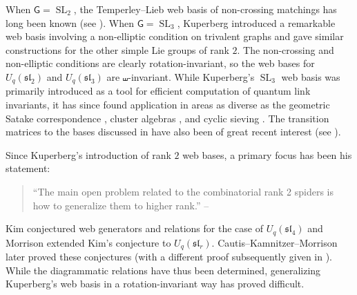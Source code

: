 \documentclass{amsart}
\theoremstyle{definition}
\theoremstyle{remark}
\numberwithin{equation}{section}
\DeclareMathOperator{\SL}{SL}
\newcommand{\fsl}{\mathfrak{sl}}
\begin{document}
When $\mathsf{G} = \SL_2$, the Temperley--Lieb web basis of non-crossing matchings has long been known (see \cite{Temperley.Lieb,Kung-Rota,Kauffman.Lins}). When $\mathsf{G} = \SL_3$, Kuperberg \cite{Kuperberg} introduced a remarkable web basis involving a non-elliptic condition on trivalent graphs and gave similar constructions for the other simple Lie groups of rank $2$. The non-crossing and non-elliptic conditions are clearly rotation-invariant, so the web bases for $U_q(\fsl_2)$ and $U_q(\fsl_3)$ are $\shuffle$-invariant. While Kuperberg's $\SL_3$ web basis was primarily introduced as a tool for efficient computation of quantum link invariants, it has since found application in areas as diverse as the geometric Satake correspondence \cite[Thm.~1.4]{Fontaine-Kamnitzer-Kuperberg}, cluster algebras \cite{Fomin-Pylyavskyy-advances}, and cyclic sieving \cite{Petersen-Pylyavskyy-Rhoades}. The transition matrices to the bases discussed in  have also been of great recent interest (see \cite{Frenkel.Khovanov,Khovanov-Kuperberg,Russell.Tymoczko:2row,Rhoades:polytabloid,Im.Zhu,Tymoczko-Russell-unitriangular,Hwang.Jang.Oh}).

Since Kuperberg's introduction of rank $2$ web bases, a primary focus has been his statement:
\begin{quote}
    \small
    ``The main open problem related to the combinatorial rank 2 spiders is how to generalize them to higher rank.'' --\cite[p.~146]{Kuperberg}
\end{quote}
Kim \cite{Kim} conjectured web generators and relations for the case of $U_q(\fsl_4)$ and Morrison \cite{Morrison} extended Kim's conjecture to $U_q(\fsl_r)$. Cautis--Kamnitzer--Morrison \cite{Cautis-Kamnitzer-Morrison} later proved these conjectures (with a different proof subsequently given in \cite{Fraser-Lam-Le}). While the diagrammatic relations have thus been determined, generalizing Kuperberg's web basis in a rotation-invariant way has proved difficult. 
\end{document}
